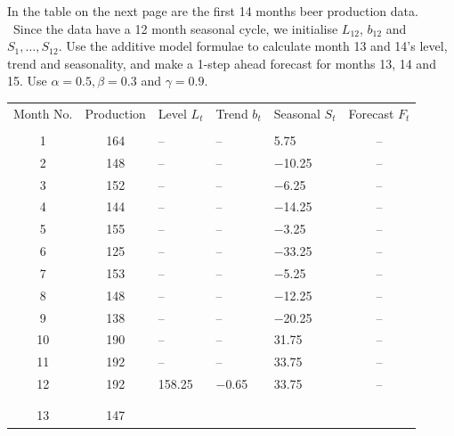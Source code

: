 \documentclass[a4paper,11pt,oneside,onecolumn]{book}
\begin{document}
In the table on the next page are the first 14 months beer
production data. \ Since the data have a 12 month seasonal cycle,
we initialise $L_{12}$, $b_{12}$ and $S_1,\ldots,S_{12}$. Use the
additive model formulae to calculate month 13 and 14's level,
trend and seasonality, and make a 1-step ahead forecast for months
13, 14 and 15. Use $\alpha=0.5, \beta=0.3$ and $\gamma=0.9$.

\begin{center}

\begin{tabular}{|cc|p{3cm}p{3cm}p{3cm}|c|} \hline

Month No. & Production & Level $L_t$ & Trend $b_t$ & Seasonal
$S_t$ & Forecast $F_t$ \\

& & & & & \\ \hline

1 & 164 & -- & -- &  5.75 & -- \\

2 & 148 & -- & -- &  $-$10.25 & -- \\

3 & 152 & -- & -- &  $-$6.25 & -- \\

4 & 144 & -- & -- &  $-$14.25 & -- \\

5 & 155 & -- & -- &  $-$3.25 & -- \\

6 & 125 & -- & -- &  $-$33.25 & -- \\

7 & 153 & -- & -- &  $-$5.25 & -- \\

8 & 148 & -- & -- &  $-$12.25 & -- \\

9 & 138 & -- & -- & $-$20.25 & -- \\

10 & 190 & -- & -- & 31.75 & -- \\

11 & 192 & -- & -- & 33.75 & -- \\

12 & 192 & 158.25 & $-$0.65 & 33.75 & -- \\

& & & & & \\ \hline

& & & & & \\

13 & 147 & & & & \\


\end{tabular}
\end{center}
\end{document}
